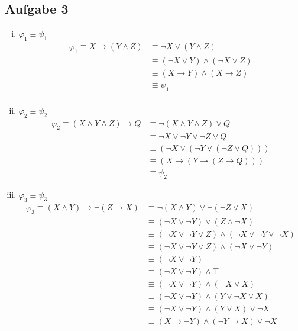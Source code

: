 \documentclass[a4paper,10pt]{article}
\begin{document}
\subsection*{Aufgabe 3}
\begin{enumerate}[(i)]
\item $\varphi_1 \equiv \psi_1$
	\begin{align*}
	\varphi_1 \equiv X \rightarrow (Y \wedge Z) 
	&\equiv \neg X \vee (Y \wedge Z) \\
	&\equiv (\neg X \vee Y) \wedge (\neg X \vee Z) \\
	&\equiv (X \rightarrow Y) \wedge (X \rightarrow Z) \\
	&\equiv \psi_1 \\
	\end{align*}
\item $\varphi_2 \equiv \psi_2$
	\begin{align*}
	\varphi_2 \equiv (X \wedge Y \wedge Z) \rightarrow Q 
	&\equiv \neg (X \wedge Y \wedge Z) \vee Q \\
	&\equiv \neg X \vee \neg Y \vee \neg Z \vee Q \\
	&\equiv (\neg X \vee (\neg Y \vee (\neg Z \vee Q))) \\
	&\equiv (X \rightarrow (Y \rightarrow (Z \rightarrow Q))) \\
	&\equiv \psi_2 
	\end{align*}	 
\item $\varphi_3 \equiv \psi_3$
	\begin{align*}
	\varphi_3 \equiv (X \wedge Y) \rightarrow \neg (Z \rightarrow X) 
	&\equiv \neg (X \wedge Y) \vee \neg (\neg Z \vee X)  \\
	&\equiv (\neg X \vee \neg Y) \vee (Z \wedge \neg X)  \\
	&\equiv (\neg X \vee \neg Y \vee Z) \wedge (\neg X \vee \neg Y \vee \neg X)  \\
	&\equiv (\neg X \vee \neg Y \vee Z) \wedge (\neg X \vee \neg Y)  \\
	&\equiv (\neg X \vee \neg Y) \\
	&\equiv (\neg X \vee \neg Y) \wedge \top \\
	&\equiv (\neg X \vee \neg Y) \wedge (\neg X \vee X) \\
	&\equiv (\neg X \vee \neg Y) \wedge (Y \vee \neg X \vee X) \\
	&\equiv (\neg X \vee \neg Y) \wedge (Y \vee X) \vee \neg X \\
	&\equiv (X \rightarrow \neg Y) \wedge (\neg Y \rightarrow X) \vee \neg X \\

\end{align*}
\end{enumerate}
\end{document}
